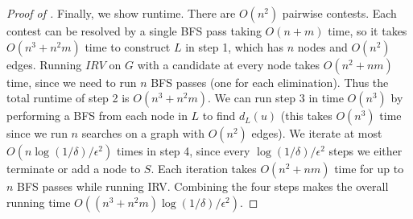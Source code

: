 \documentclass{article}
\theoremstyle{theorem}
\theoremstyle{definition}
\begin{document}
\begin{proof}[Proof of ]
  Finally, we show runtime. There are $O(n^2)$ pairwise contests. Each contest can be resolved by a single BFS pass taking $O(n + m)$ time, so it takes $O(n^3 + n^2m)$ time to construct $L$ in step 1, which has $n$ nodes and $O(n^2)$ edges. Running $IRV$ on $G$ with a candidate at every node takes $O(n^2+nm)$ time, since we need to run $n$ BFS passes (one for each elimination). Thus the total runtime of step 2 is $O(n^3 + n^2 m)$. We can run step 3 in time $O(n^3)$ by performing a BFS from each node in $L$ to find $d_L(u)$ (this takes $O(n^3)$ time since we run $n$ searches on a graph with $O(n^2)$ edges). We iterate at most $O(n\log(1/\delta)/\epsilon^2)$ times in step 4, since every $\log(1/\delta)/\epsilon^2$ steps we either terminate or add a node to $S$. Each iteration takes $O(n^2 + nm)$ time for up to $n$ BFS passes while running IRV. Combining the four steps makes the overall running time $O((n^3 +n^2m)\log(1/\delta)/\epsilon^2)$.

\end{proof}
\end{document}
